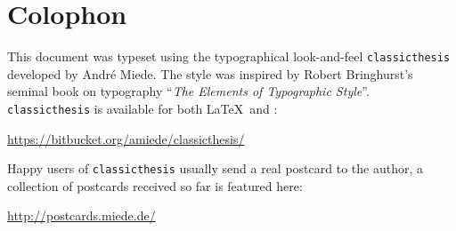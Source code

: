 \pagestyle{empty}
\hfill
\vfill

\section*{Colophon}

This document was typeset using the typographical look-and-feel \texttt{classicthesis} developed by Andr\'e Miede.
The style was inspired by Robert Bringhurst's seminal book on typography ``\emph{The Elements of Typographic Style}''.
\texttt{classicthesis} is available for both \LaTeX\ and \mLyX: 
\begin{center}
\url{https://bitbucket.org/amiede/classicthesis/}
\end{center}
\noindent Happy users of \texttt{classicthesis} usually send a real postcard to the author,
a collection of postcards received so far is featured here: 
\begin{center}
\url{http://postcards.miede.de/}
\end{center}
 
\bigskip
\noindent\finalVersionString